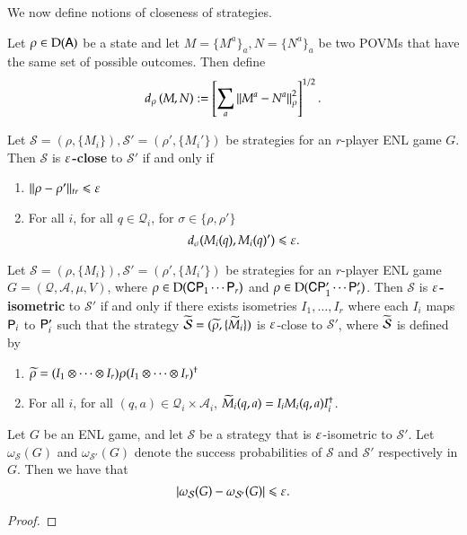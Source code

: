 We now define notions of closeness of strategies. 

\begin{definition}
	Let $\rho \in \mathrm{D}({\mathsf{A}})$ be a state and let $M = \{M^a\}_a,N = \{N^a\}_a$ be two POVMs that have the same set of possible outcomes. Then define 
	\begin{align}
		d_\rho \left( M, N \right) := \left[ \sum_a \left\lVert M^a - N^a \right\rVert_\rho^2 \right]^{1/2}.
	\end{align}
\end{definition}


\begin{definition}
	Let $\mathcal{S} = (\rho,\{M_i\}), \mathcal{S}' = (\rho',\{M_i'\})$ be strategies for an $r$-player ENL game $G$. Then $\mathcal{S}$ is \textbf{$\varepsilon$-close} to $\mathcal{S}'$ if and only if
	\begin{enumerate}
		\item $ \lVert \rho - \rho'\rVert_{tr} \leqslant \varepsilon$
		\item For all $i$, for all $q \in \mathcal{Q}_i$, for $\sigma \in \{\rho,\rho'\}$
		\[
		d_\sigma(M_i(q),M_i(q)') \leqslant \varepsilon.
		\]
	\end{enumerate}
\end{definition}

\begin{definition}
	Let $\mathcal{S} = (\rho,\{M_i\}), \mathcal{S}' = (\rho',\{M_i'\})$ be strategies for an $r$-player ENL game $G = (\mathcal{Q},\mathcal{A},\mu,V)$, where $\rho \in \mathrm{D}({\mathsf{C}} {\mathsf{P}}_1 \cdots {\mathsf{P}}_r)$ and $\rho \in \mathrm{D}({\mathsf{C}} {\mathsf{P}}_1' \cdots {\mathsf{P}}_r')$. Then $\mathcal{S}$ is \textbf{$\varepsilon$-isometric} to $\mathcal{S}'$ if and only if there exists isometries $I_1,\ldots,I_r$ where each $I_i$ maps ${\mathsf{P}}_i$ to ${\mathsf{P}}_i'$ such that the strategy $\widetilde{\mathcal{S}} = (\widetilde{\rho}, \{ \widetilde{M}_i \})$ is $\varepsilon$-close to $\mathcal{S}'$, where $\widetilde{\mathcal{S}}$ is defined by
	\begin{enumerate}
		\item $\widetilde{\rho} = (I_1 \otimes \cdots \otimes I_r) \rho (I_1 \otimes \cdots \otimes I_r)^\dagger$
		\item For all $i$, for all $(q,a) \in \mathcal{Q}_i \times \mathcal{A}_i$, $\widetilde{M}_i(q,a) = I_i M_i(q,a) I_i^\dagger$.
	\end{enumerate}
\end{definition}


\begin{lemma}
\label{lem:close_strategies}
	Let $G$ be an ENL game, and let $\mathcal{S}$ be a strategy that is $\varepsilon$-isometric to $\mathcal{S}'$. Let $\omega_{\mathcal{S}}(G)$ and $\omega_{\mathcal{S}'}(G)$ denote the success probabilities of $\mathcal{S}$ and $\mathcal{S}'$ respectively in $G$. Then we have that
	\[
		\left\lvert \omega_{\mathcal{S}}(G) - \omega_{\mathcal{S}'}(G) \right\rvert \leqslant \varepsilon.
	\]
\end{lemma}
\begin{proof}
\end{proof}

